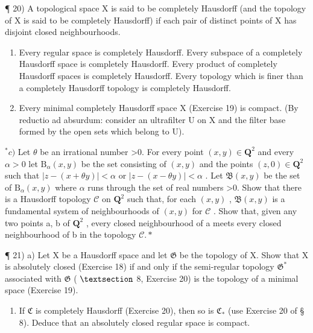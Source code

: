 ¶ 20) A topological space X is said to be completely Hausdorff (and the topology of X is said to be completely Hausdorff) if each pair of distinct points of X has disjoint closed neighbourhoods.

\begin{enumerate}
\def\labelenumi{\alph{enumi})}
\item
  Every regular space is completely Hausdorff. Every subspace of a completely Hausdorff space is completely Hausdorff. Every product of completely Hausdorff spaces is completely Hausdorff. Every topology which is finer than a completely Hausdorff topology is completely Hausdorff.
\item
  Every minimal completely Hausdorff space X (Exercise 19) is compact. (By reductio ad absurdum: consider an ultrafilter U on X and the filter base formed by the open sets which belong to U).
\end{enumerate}

\(^{*}c)\) Let \(\theta\) be an irrational number \textgreater0. For every point \((x,y)\in\mathbf{Q}^{2}\) and every \(\alpha>0\) let \(\mathrm{B}_{\alpha}(x,y)\) be the set consisting of \((x,y)\) and the points \((z,0)\in\mathbf{Q}^{2}\) such that \(|z-(x+\theta y)|<\alpha\) or \(|z-(x-\theta y)|<\alpha\) . Let \(\mathfrak{B}(x,y)\) be the set of \(\mathrm{B}_{\alpha}(x,y)\) where \(\alpha\) runs through the set of real numbers \textgreater0. Show that there is a Hausdorff topology \(\mathcal{C}\) on \(\mathbf{Q}^{2}\) such that, for each \((x,y)\) , \(\mathfrak{B}(x,y)\) is a fundamental system of neighbourhoods of \((x,y)\) for \(\mathcal{C}\) . Show that, given any two points a, b of \(\mathbf{Q}^{2}\) , every closed neighbourhood of a meets every closed neighbourhood of b in the topology \(\mathcal{C}.*\)

¶ 21) a) Let X be a Hausdorff space and let \(\mathfrak{G}\) be the topology of X. Show that X is absolutely closed (Exercise 18) if and only if the semi-regular topology \(\mathfrak{G}^*\) associated with \(\mathfrak{G}\) ( \(\S\) 8, Exercise 20) is the topology of a minimal space (Exercise 19).

\begin{enumerate}
\def\labelenumi{\alph{enumi})}
\setcounter{enumi}{1}
\tightlist
\item
  If \(\mathfrak{C}\) is completely Hausdorff (Exercise 20), then so is \(\mathfrak{C}_{*}\) (use Exercise 20 of § 8). Deduce that an absolutely closed regular space is compact.
\end{enumerate}

